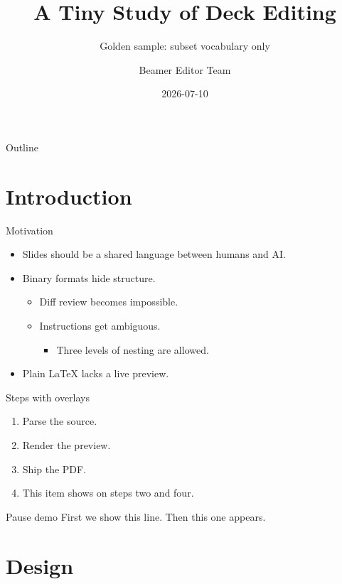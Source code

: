 \documentclass[aspectratio=169]{beamer}
\title{A Tiny Study of Deck Editing}
\subtitle{Golden sample: subset vocabulary only}
\author{Beamer Editor Team}
\institute{Slide Tools Lab}
\date{2026-07-10}
\begin{document}
\begin{frame}
  \titlepage
\end{frame}

\begin{frame}{Outline}
  \tableofcontents
\end{frame}

\section{Introduction}

\begin{frame}{Motivation}
  \begin{itemize}
    \item Slides should be a shared language between humans and AI.
    \item Binary formats hide structure.
      \begin{itemize}
        \item Diff review becomes impossible.
        \item Instructions get ambiguous.
          \begin{itemize}
            \item Three levels of nesting are allowed.
          \end{itemize}
      \end{itemize}
    \item Plain LaTeX lacks a live preview.
  \end{itemize}
\end{frame}

\begin{frame}{Steps with overlays}
  \begin{enumerate}
    \item<1-> Parse the source.
    \item<2-> Render the preview.
    \item<3> Ship the PDF.
    \item<2,4> This item shows on steps two and four.
  \end{enumerate}
\end{frame}

\begin{frame}{Pause demo}
  First we show this line.
  \pause
  Then this one appears.
\end{frame}

\section{Design}
\end{document}
